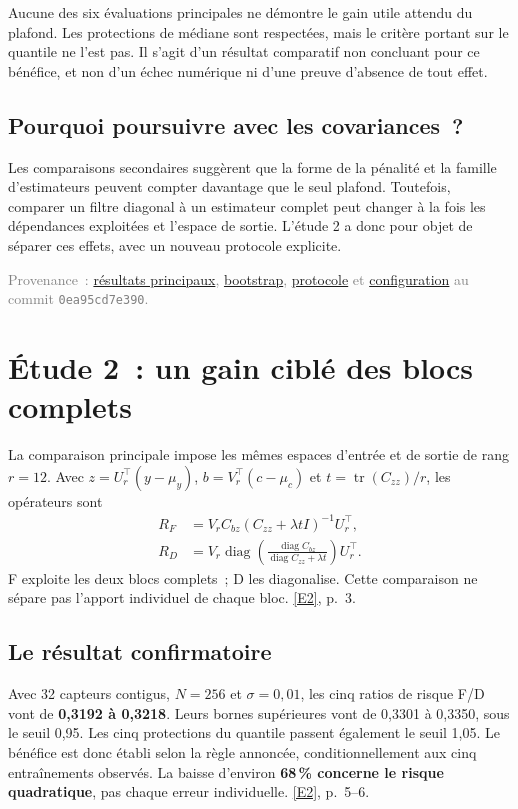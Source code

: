 \documentclass[11pt,a4paper]{article}
\newcommand{\src}[1]{\textcolor{graytext}{\footnotesize #1}}
\newcommand{\repo}{https://github.com/halhoulmhamed-droid/inverse-laplace-learning}
\newcommand{\shaone}{0ea95cd7e390c8a478469b36a043a5f99e4fcd10}
\newcommand{\gitlink}[3]{\href{\repo/blob/#1/#2}{#3}}
\DeclareRobustCommand{\eref}[1]{\hyperlink{ref#1}{[#1]}}
\begin{document}
\begin{keybox}
Aucune des six évaluations principales ne démontre le gain utile attendu du plafond.
Les protections de médiane sont respectées, mais le critère portant sur le quantile ne l'est pas.
Il s'agit d'un résultat comparatif non concluant pour ce bénéfice, et non d'un échec numérique
ni d'une preuve d'absence de tout effet.
\end{keybox}

\subsection*{Pourquoi poursuivre avec les covariances~?}
Les comparaisons secondaires suggèrent que la forme de la pénalité et la famille d'estimateurs
peuvent compter davantage que le seul plafond. Toutefois, comparer un filtre diagonal à un
estimateur complet peut changer à la fois les dépendances exploitées et l'espace de sortie.
L'étude 2 a donc pour objet de séparer ces effets, avec un nouveau protocole explicite.

\src{Provenance~: \gitlink{\shaone}{results/analysis/primary.json}{résultats principaux},
\gitlink{\shaone}{results/analysis/bootstrap.npz}{bootstrap},
\gitlink{\shaone}{docs/protocol.md}{protocole} et
\gitlink{\shaone}{results/full/configuration.json}{configuration} au commit \texttt{0ea95cd7e390}.}

\newpage
\section{Étude 2~: un gain ciblé des blocs complets}
La comparaison principale impose les mêmes espaces d'entrée et de sortie de rang $r=12$.
Avec $z=U_r^\top(y-\mu_y)$, $b=V_r^\top(c-\mu_c)$ et
$t=\operatorname{tr}(C_{zz})/r$, les opérateurs sont
\begin{align*}
R_F&=V_rC_{bz}(C_{zz}+\lambda tI)^{-1}U_r^\top,\\
R_D&=V_r\operatorname{diag}\!\left(
\frac{\operatorname{diag}C_{bz}}{\operatorname{diag}C_{zz}+\lambda t}\right)U_r^\top.
\end{align*}
F exploite les deux blocs complets~; D les diagonalise. Cette comparaison ne sépare pas
l'apport individuel de chaque bloc. \eref{E2}, p.~3.

\subsection*{Le résultat confirmatoire}
Avec 32 capteurs contigus, $N=256$ et $\sigma=0,01$, les cinq ratios de risque F/D vont
de \textbf{0,3192 à 0,3218}. Leurs bornes supérieures vont de 0,3301 à 0,3350, sous le seuil
0,95. Les cinq protections du quantile passent également le seuil 1,05. Le bénéfice est donc
établi selon la règle annoncée, conditionnellement aux cinq entraînements observés.
La baisse d'environ \textbf{68\,\% concerne le risque quadratique}, pas chaque erreur individuelle.
\eref{E2}, p.~5--6.
\end{document}
